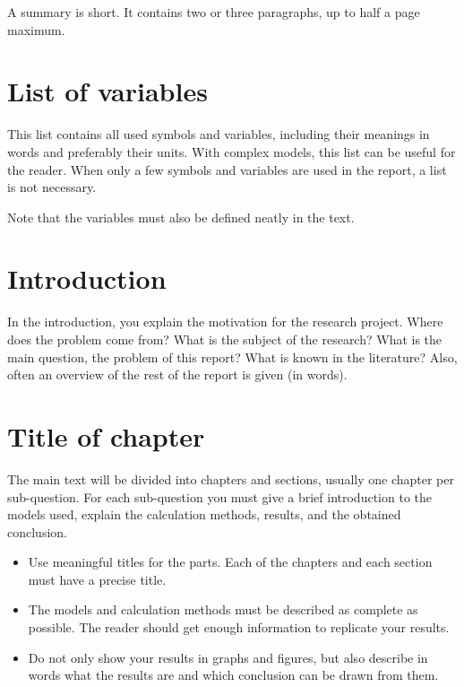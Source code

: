 \documentclass[11pt, a4paper, twoside]{report}
\begin{document}
A summary is short. It contains two or three paragraphs, up to half a page maximum.  


\newpage
\tableofcontents %


\chapter*{List of variables}
This list contains all used symbols and variables, including their meanings in words and preferably their units. With complex models, this list can be useful for the reader. When only a few symbols and variables are used in the report, a list is not necessary.

Note that the variables must also be defined neatly in the text.


\chapter{Introduction} %
In the introduction, you explain the motivation for the research project. Where does the problem come from? What is the subject of the research? What is the main question, the problem of this report? What is known in the literature? Also, often an overview of the rest of the report is given (in words). 


\chapter{Title of chapter}
The main text will be divided into chapters and sections, usually one chapter per sub-question. For each sub-question you must give a brief introduction to the models used, explain the calculation methods, results, and the obtained conclusion. 

\begin{itemize}
\item Use meaningful titles for the parts. Each of the chapters and each section must have a precise title. 
\item The models and calculation methods must be described as complete as possible. The reader should get enough information to replicate your results. 
\item Do not only show your results in graphs and figures, but also describe in words what the results are and which conclusion can be drawn from them. 
\end{itemize}
\end{document}
